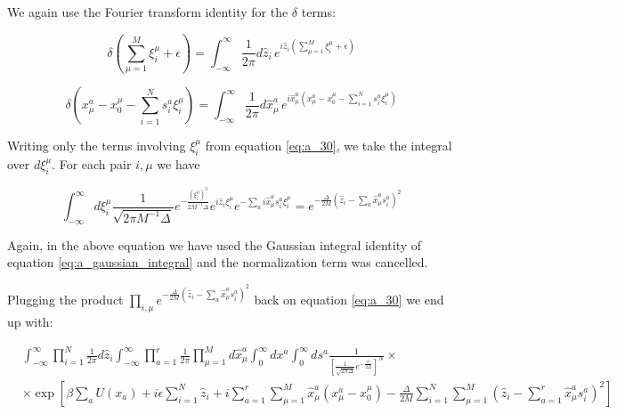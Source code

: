 We again use the Fourier transform identity for the $\delta$ terms:

\begin{equation}
  \label{eq:a_31}
  \delta\left(\sum_{\mu=1}^M \xi_i^\mu + \epsilon\right) =
  \int_{-\infty}^\infty \frac{1}{2\pi} d\hat{z}_i \, e^{i \hat{z}_i \left(\sum_{\mu=1}^M \xi_i^\mu + \epsilon\right)}
\end{equation}

\begin{equation}
  \label{eq:a_32}
  \delta \left(x_\mu^a - x_0^\mu - \sum_{i=1}^N s_i^a \xi_i^\mu\right) = \int_{-\infty}^\infty \frac{1}{2\pi} d\hat{x}_\mu^a\, e^{i \hat{x}_\mu^a \left(x_\mu^a - x_0^\mu - \sum_{i=1}^N s_i^a \xi_i^\mu\right)}
\end{equation}

Writing only the terms involving $\xi_i^\mu$ from equation
\eqref{eq:a_30}, we take the integral over $d\xi_i^\mu$. For each pair
$i,\mu$ we have

\begin{equation}
  \label{eq:a_34}
  \int_{-\infty}^\infty d\xi_i^\mu \frac{1}{\sqrt{2\pi
      M^{-1}\Delta}}e^{-\frac{(\xi_i^\mu)^2}{2 M^{-1}\Delta}} e^{i
    \hat{z}_i \xi_i^\mu} e^{-\sum_a i \hat{x}_\mu^a s_i^a \xi_i^\mu} =
  e^{-\frac{\Delta}{2M} \left(\hat{z}_i - \sum_a \hat{x}_\mu^a s_i^a\right)^2}
\end{equation}

Again, in the above equation we have used the Gaussian integral
identity of equation \eqref{eq:a_gaussian_integral} and the
normalization term was cancelled.

Plugging the product $\prod_{i,\mu} e^{-\frac{\Delta}{2M} \left(\hat{z}_i
 - \sum_a \hat{x}_\mu^a s_i^a\right)^2}$ back on equation
\eqref{eq:a_30} we end up with:

\begin{align}
  \label{eq:a_33}
  & \int_{-\infty}^\infty \prod_{i=1}^N 
  \frac{1}{2\pi} d\hat{z}_i \int_{-\infty}^\infty \prod_{a=1}^r
  \frac{1}{2\pi} \prod_{\mu=1}^M d\hat{x}_\mu^a \int_0^{\infty} d x^a
  \int_0^\infty ds^a \frac{1}{\left[\frac{1}{\sqrt{2\pi\Delta}}
      e^{-\frac{\epsilon^2}{2\Delta}}\right]^N}  \times \\ 
  & \times \exp\left[\beta \sum_a U(x_a) + i\epsilon\sum_{i=1}^N \hat{z}_i + i\sum_{a=1}^r \sum_{\mu=1}^M
    \hat{x}_\mu^a \left(x_\mu^a - x_0^\mu\right) -
    \frac{\Delta}{2M}\sum_{i=1}^N \sum_{\mu=1}^M\left(\hat{z}_i -
      \sum_{a=1}^r \hat{x}_\mu^a s_i^a \right)^2\right]
\end{align}

